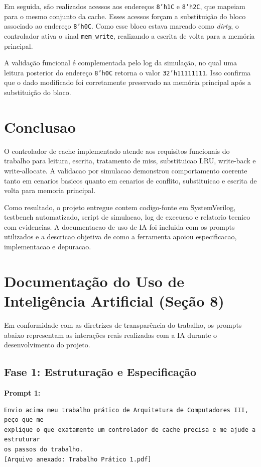 ﻿\documentclass[12pt,a4paper]{article}
\begin{document}
Em seguida, são realizados acessos aos endereços \texttt{8'h1C} e \texttt{8'h2C}, que mapeiam para o mesmo conjunto da cache. Esses acessos forçam a substituição do bloco associado ao endereço \texttt{8'h0C}. Como esse bloco estava marcado como \textit{dirty}, o controlador ativa o sinal \texttt{mem\_write}, realizando a escrita de volta para a memória principal.

A validação funcional é complementada pelo log da simulação, no qual uma leitura posterior do endereço \texttt{8'h0C} retorna o valor \texttt{32'h11111111}. Isso confirma que o dado modificado foi corretamente preservado na memória principal após a substituição do bloco.

\section{Conclusao}
O controlador de cache implementado atende aos requisitos funcionais do trabalho para leitura, escrita, tratamento de miss, substituicao LRU, write-back e write-allocate. A validacao por simulacao demonstrou comportamento coerente tanto em cenarios basicos quanto em cenarios de conflito, substituicao e escrita de volta para memoria principal.

Como resultado, o projeto entregue contem codigo-fonte em SystemVerilog, testbench automatizado, script de simulacao, log de execucao e relatorio tecnico com evidencias. A documentacao de uso de IA foi incluida com os prompts utilizados e a descricao objetiva de como a ferramenta apoiou especificacao, implementacao e depuracao.
\section{Documentação do Uso de Inteligência Artificial (Seção 8)}
\label{sec:ia_documentation}

Em conformidade com as diretrizes de transparência do trabalho, os prompts abaixo representam as interações reais realizadas com a IA durante o desenvolvimento do projeto.

\subsection{Fase 1: Estruturação e Especificação}
\textbf{Prompt 1:}
\begin{verbatim}
Envio acima meu trabalho prático de Arquitetura de Computadores III, peço que me 
explique o que exatamente um controlador de cache precisa e me ajude a estruturar 
os passos do trabalho.
[Arquivo anexado: Trabalho Prático 1.pdf]
\end{verbatim}
\end{document}
